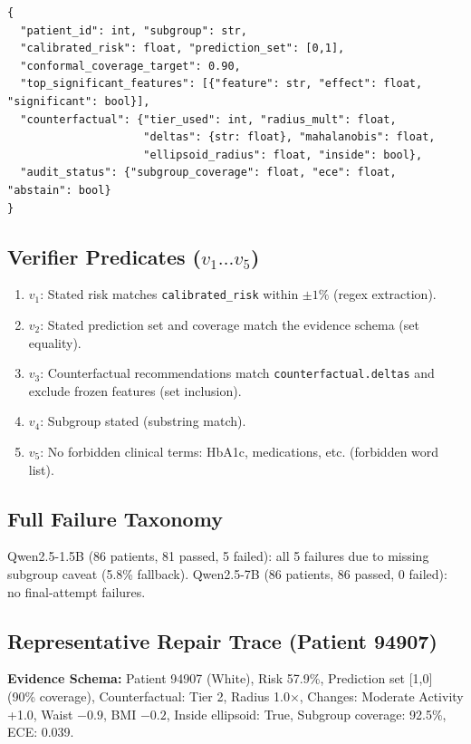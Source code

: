 \documentclass[11pt,a4paper]{article}
\theoremstyle{plain}
\begin{document}
{\footnotesize
\begin{verbatim}
{
  "patient_id": int, "subgroup": str,
  "calibrated_risk": float, "prediction_set": [0,1],
  "conformal_coverage_target": 0.90,
  "top_significant_features": [{"feature": str, "effect": float, "significant": bool}],
  "counterfactual": {"tier_used": int, "radius_mult": float,
                     "deltas": {str: float}, "mahalanobis": float,
                     "ellipsoid_radius": float, "inside": bool},
  "audit_status": {"subgroup_coverage": float, "ece": float, "abstain": bool}
}
\end{verbatim}
}

\subsection{Verifier Predicates ($v_1 \dots v_5$)}

\begin{enumerate}
\item $v_1$: Stated risk matches \texttt{calibrated\_risk} within $\pm 1\%$ (regex extraction).
\item $v_2$: Stated prediction set and coverage match the evidence schema (set equality).
\item $v_3$: Counterfactual recommendations match \texttt{counterfactual.deltas} and exclude frozen features (set inclusion).
\item $v_4$: Subgroup stated (substring match).
\item $v_5$: No forbidden clinical terms: HbA1c, medications, etc. (forbidden word list).
\end{enumerate}

\subsection{Full Failure Taxonomy}

Qwen2.5-1.5B (86 patients, 81 passed, 5 failed): all 5 failures due to missing subgroup caveat (5.8\% fallback). Qwen2.5-7B (86 patients, 86 passed, 0 failed): no final-attempt failures.

\subsection{Representative Repair Trace (Patient 94907)}

\textbf{Evidence Schema:} Patient 94907 (White), Risk 57.9\%, Prediction set [1,0] (90\% coverage), Counterfactual: Tier 2, Radius 1.0$\times$, Changes: Moderate Activity +1.0, Waist $-0.9$, BMI $-0.2$, Inside ellipsoid: True, Subgroup coverage: 92.5\%, ECE: 0.039.
\end{document}
